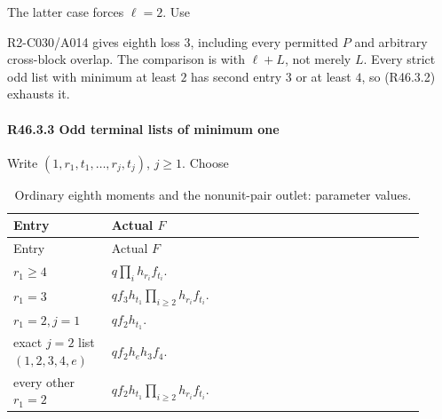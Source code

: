 
The latter case forces \(\ell=2.\) Use


R2-C030/A014 gives eighth loss \(3\), including every permitted \(P\) and
arbitrary cross-block overlap. The comparison is with \(\ell+L\),
not merely \(L\). Every strict odd list with minimum at least \(2\) has second
entry \(3\) or at least \(4\), so (R46.3.2) exhausts it.

\paragraph{R46.3.3 Odd terminal lists of minimum one}

Write \((1,\allowbreak r_1,\allowbreak t_1,\allowbreak \ldots,\allowbreak r_j,\allowbreak t_j)\), \(j\ge 1.\) Choose


\begingroup\small
\setlength{\tabcolsep}{3pt}
\setlength{\LTleft}{0pt}\setlength{\LTright}{\fill}
\begin{longtable}{@{}p{0.2200\linewidth}p{0.7000\linewidth}@{}}
\caption{Ordinary eighth moments and the nonunit-pair outlet: parameter values.}\label{tab:parameters:r2-c046:2}\\
\toprule
Entry & Actual \(F\) \\
\midrule\endfirsthead
\toprule
Entry & Actual \(F\) \\
\midrule\endhead
\bottomrule\endfoot
\(r_{1}\ge 4\) & \(q \prod_i h_{r_i} f_{t_i}\). \\
\addlinespace[2pt]
\(r_{1}=3\) & \(q f_{3} h_{t_1} \prod_{i\ge 2}h_{r_i} f_{t_i}\). \\
\addlinespace[2pt]
\(r_{1}=2,\allowbreak j=1\) & \(q f_{2} h_{t_1}\). \\
\addlinespace[2pt]
exact \(j=2\) list \((1,2,3,4,e)\) & \(q f_{2} h_e h_{3} f_{4}\). \\
\addlinespace[2pt]
every other \(r_{1}=2\) & \(q f_{2} h_{t_1} \prod_{i\ge 2}h_{r_i} f_{t_i}\). \\
\end{longtable}
\endgroup


